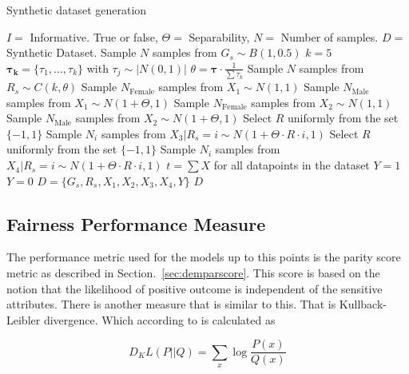 \begin{algorithm}
    \caption{Synthetic dataset generation}
    \begin{algorithmic}
        \REQUIRE $I = $ Informative. True or false, $\Theta = $ Separability, $N =$ Number of samples.
        \ENSURE $D = $ Synthetic Dataset.
        \STATE Sample $N$ samples from $G_s \sim B(1, 0.5)$
        \STATE $k = 5$
        \STATE $\boldsymbol{\tau_k} = \{ \tau_1, \dots, \tau_k \}$ with $\tau_j \sim |N(0, 1)|$
        \STATE $\theta = \boldsymbol{\tau} \cdot \frac{1}{\sum \tau_k}$
        \STATE Sample $N$ samples from $R_s \sim C(k, \theta)$
        \STATE Sample $N_{\text{Female}}$ samples from $X_1 \sim N(1, 1)$
        \STATE Sample $N_{\text{Male}}$ samples from $X_1 \sim N(1 + \Theta, 1)$
        \STATE Sample $N_{\text{Female}}$ samples from $X_2 \sim N(1, 1)$
        \STATE Sample $N_{\text{Male}}$ samples from $X_2 \sim N(1 + \Theta, 1)$
        \STATE Select $R$ uniformly from the set $\{ -1, 1\}$
        \STATE Sample $N_i$ samples from $X_3 | R_s = i \sim N(1 + \Theta \cdot R \cdot i, 1)$
        \STATE Select $R$ uniformly from the set $\{ -1, 1\}$
        \STATE Sample $N_i$ samples from $X_4 | R_s = i \sim N(1 + \Theta \cdot R \cdot i, 1)$
        \ENDFOR
        \STATE $t = \sum X$ for all datapoints in the dataset
        \STATE $Y = 1$
        \ELSE
        \STATE $Y = 0$
        \ENDIF
        \STATE $D = \{G_s, R_s, X_1, X_2, X_3, X_4, Y \}$
        \RETURN $D$
    \end{algorithmic}
    \label{alg:datasetgen}
\end{algorithm}

\subsection{Fairness Performance Measure}

The performance metric used for the models up to this points is the parity score metric as described in Section.~\ref{sec:demparscore}. This score is based on the notion that the likelihood of positive outcome is independent of the sensitive attributes. There is another measure that is similar to this. That is Kullback-Leibler divergence. Which according to \citet{Mackay:2003:information} is calculated as 

\begin{equation*}
    D_KL(P ||Q) = \sum_x \log\frac{P(x)}{Q(x)}
\end{equation*}

